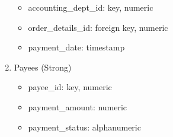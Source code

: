 \begin{enumerate}
    \begin{itemize}
        \item accounting\_dept\_id: key, numeric
        \item order\_details\_id: foreign key, numeric
        \item payment\_date: timestamp
    \end{itemize}
\item Payees (Strong)
    \begin{itemize}
        \item payee\_id: key, numeric
        \item payment\_amount: numeric
        \item payment\_status: alphanumeric
    \end{itemize}
\end{enumerate}
